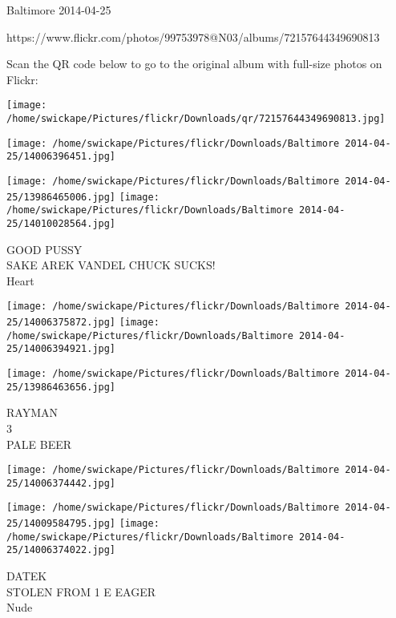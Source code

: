 \documentclass[10pt,letterpaper]{article}
\begin{document}
Baltimore 2014-04-25

https://www.flickr.com/photos/99753978@N03/albums/72157644349690813

Scan the QR code below to go to the original album with full-size photos on Flickr:

\texttt{[image: /home/swickape/Pictures/flickr/Downloads/qr/72157644349690813.jpg]}
\pagebreak

\texttt{[image: /home/swickape/Pictures/flickr/Downloads/Baltimore 2014-04-25/14006396451.jpg]}

\vspace{0.25in}
\texttt{[image: /home/swickape/Pictures/flickr/Downloads/Baltimore 2014-04-25/13986465006.jpg]}
\texttt{[image: /home/swickape/Pictures/flickr/Downloads/Baltimore 2014-04-25/14010028564.jpg]}

GOOD PUSSY\\
SAKE AREK VANDEL CHUCK SUCKS!\\
Heart\\
\pagebreak

\texttt{[image: /home/swickape/Pictures/flickr/Downloads/Baltimore 2014-04-25/14006375872.jpg]}
\texttt{[image: /home/swickape/Pictures/flickr/Downloads/Baltimore 2014-04-25/14006394921.jpg]}

\vspace{0.25in}
\texttt{[image: /home/swickape/Pictures/flickr/Downloads/Baltimore 2014-04-25/13986463656.jpg]}

RAYMAN\\
3\\
PALE BEER\\
\pagebreak

\texttt{[image: /home/swickape/Pictures/flickr/Downloads/Baltimore 2014-04-25/14006374442.jpg]}

\vspace{0.25in}
\texttt{[image: /home/swickape/Pictures/flickr/Downloads/Baltimore 2014-04-25/14009584795.jpg]}
\texttt{[image: /home/swickape/Pictures/flickr/Downloads/Baltimore 2014-04-25/14006374022.jpg]}

DATEK\\
STOLEN FROM 1 E EAGER\\
Nude\\
\pagebreak
\end{document}
